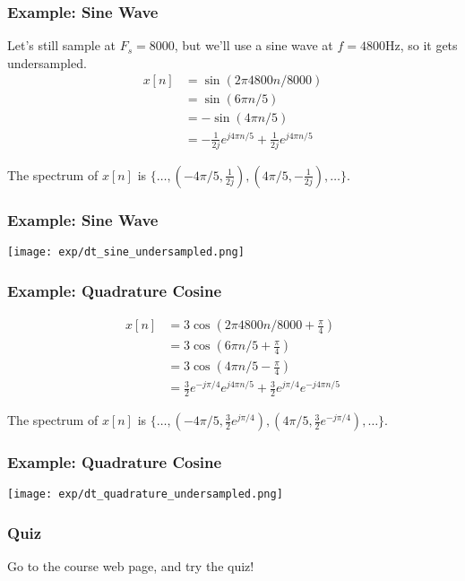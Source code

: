 \documentclass{beamer}
\begin{document}
\begin{frame}
  \frametitle{Example: Sine Wave}

  Let's still sample at $F_s=8000$, but we'll use a sine wave at
  $f=4800$Hz, so it gets undersampled.
  \begin{align*}
    x[n] &= \sin\left(2\pi 4800n/8000\right)\\
    &= \sin\left(6\pi n/5\right)\\
    &= -\sin\left(4\pi n/5\right)\\
    &= -\frac{1}{2j}e^{j4\pi n/5} + \frac{1}{2j}e^{j4\pi n/5}
  \end{align*}

  The spectrum of $x[n]$ is $\{\ldots,(-4\pi/5,\frac{1}{2j}),(4\pi/5,-\frac{1}{2j}),\ldots\}$.
\end{frame}

\begin{frame}
  \frametitle{Example: Sine Wave}

  \centerline{\texttt{[image: exp/dt\_sine\_undersampled.png]}}
\end{frame}

\begin{frame}
  \frametitle{Example: Quadrature Cosine}

  \begin{align*}
    x[n] &= 3\cos\left(2\pi 4800n/8000+\frac{\pi}{4}\right)\\
    &= 3\cos\left(6\pi n/5+\frac{\pi}{4}\right)\\
    &= 3\cos\left(4\pi n/5-\frac{\pi}{4}\right)\\
    &= \frac{3}{2}e^{-j\pi/4}e^{j4\pi n/5} + \frac{3}{2}e^{j\pi/4}e^{-j4\pi n/5}
  \end{align*}

  The spectrum of $x[n]$ is $\{\ldots,(-4\pi/5,\frac{3}{2}e^{j\pi/4}),(4\pi/5,\frac{3}{2}e^{-j\pi/4}),\ldots\}$.
\end{frame}

\begin{frame}
  \frametitle{Example: Quadrature Cosine}

  \centerline{\texttt{[image: exp/dt\_quadrature\_undersampled.png]}}
\end{frame}

\begin{frame}
  \frametitle{Quiz}

  Go to the course web page, and try the quiz!
\end{frame}
\end{document}
